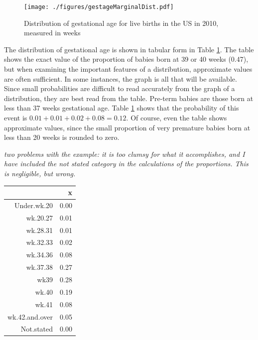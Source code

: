 \begin{figure}
  \centering
  \texttt{[image: ./figures/gestageMarginalDist.pdf]}
  \caption{Distribution of gestational age for live births in the US in 2010, measured in weeks}
  \label{fig:gestageMarginalDist}
\end{figure}


The distribution of gestational age is shown in tabular form in Table \ref{gestageMarginalDistTable}.  The table shows the exact value of the proportion of babies born at 39 or 40 weeks (0.47), but when examining the important features of a distribution, approximate values are often sufficient.  In some instances, the graph is all that will be available.  Since small probabilities are difficult to read accurately from the graph of a distribution, they are best read from the table.  Pre-term babies are those born at less than 37 weeks gestational age.  Table \ref{gestageMarginalDistTable} shows that the probability of this event is $0.01 + 0.01 + 0.02 + 0.08 = 0.12$.  Of course, even the table shows approximate values, since the small proportion of very premature babies born at less than 20 weeks is rounded to zero.

\textit{two problems with the example: it is too clumsy for what it accomplishes, and I have  included the not stated category in the calculations of the proportions.  This is negligible, but wrong.}

\begin{table}[ht]
\label{gestageMarginalDistTable}
\centering
\begin{tabular}{rr}
  \hline
 & x \\ 
  \hline
Under.wk.20 & 0.00 \\ 
  wk.20.27 & 0.01 \\ 
  wk.28.31 & 0.01 \\ 
  wk.32.33 & 0.02 \\ 
  wk.34.36 & 0.08 \\ 
  wk.37.38 & 0.27 \\ 
  wk39 & 0.28 \\ 
  wk.40 & 0.19 \\ 
  wk.41 & 0.08 \\ 
  wk.42.and.over & 0.05 \\ 
  Not.stated & 0.00 \\ 
   \hline
\end{tabular}
\end{table}

